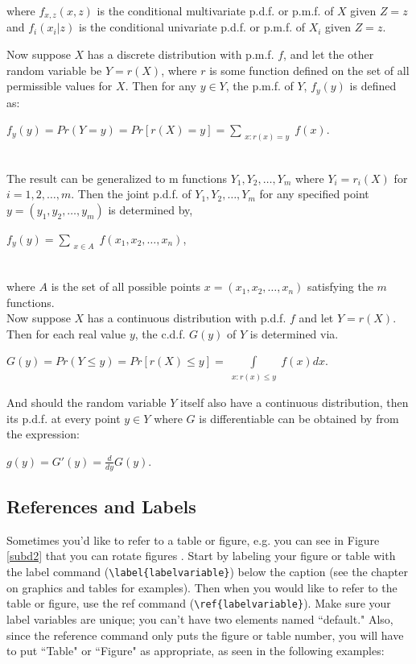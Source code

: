 \documentclass[12pt,twoside]{reedthesis}
\begin{document}
\begin{enumerate}
\begin{enumerate}
where $f_{x,z}(x, z)$ is the conditional multivariate p.d.f. or p.m.f. of $X$ given $Z = z$ and $f_i(x_i|z)$ is the conditional univariate p.d.f. or p.m.f. of $X_i$ given $Z = z$. 

Now suppose $X$ has a discrete distribution with p.m.f. $f$, and let the other random variable be $Y = r(X)$, where $r$ is some function defined on the set of all permissible values for $X$. Then for any $y \in Y$, the p.m.f. of $Y$, $f_y(y)$ is defined as:
\begin{center}
$f_y(y) = Pr(Y = y) = Pr[r(X) = y] = \sum\limits_{\substack{x:r(x)  = y}} f(x)$.
\end{center}\\

The result can be generalized to m functions $Y_1, Y_2, … , Y_m$ where $Y_i = r_i(X)$ for $i = {1, 2, \dotsc, m}$. Then the joint p.d.f. of $Y_1, Y_2, \dotsc , Y_m$ for any specified point $y = (y_1, y_2, … , y_m)$ is determined by,
\begin{center}
$f_y(y) = \sum\limits_{\substack{x \in A}} f(x_1, x_2, \dotsc ,x_n)$,
\end{center}\\

where $A$ is the set of all possible points $x = (x_1, x_2, \dotsc , x_n)$ satisfying the $m$ functions.\\
  
Now suppose $X$ has a continuous distribution with p.d.f. $f$ and let $Y = r(X)$. Then for each real value $y$, the c.d.f. $G(y)$ of $Y$ is determined via. 
\begin{center}
$G(y) = Pr(Y \leq y) = Pr[r(X) \leq y] =  \int\limits_{\substack{x:r(x)  ≤ y}} f(x) dx$.
\end{center}
And should the random variable $Y$ itself also have a continuous distribution, then its p.d.f. at every point $y \in Y$ where $G$ is differentiable can be obtained by from the expression: 
\begin{center}
$g(y) = G'(y) = \frac{d}{dy} G(y)$.
\end{center}






\subsection{References and Labels}
Sometimes you'd like to refer to a table or figure, e.g. you can see in Figure \ref{subd2} that you can rotate figures . Start by labeling your figure or table with the label command (\verb=\label{labelvariable}=) below the caption (see the chapter on graphics and tables for examples). Then when you would like to refer to the table or figure, use the ref command (\verb=\ref{labelvariable}=). Make sure your label variables are unique; you can't have two elements named ``default." Also, since the reference command only puts the figure or table number, you will have to put  ``Table" or ``Figure" as appropriate, as seen in the following examples:



\end{enumerate}
\end{enumerate}
\end{document}
